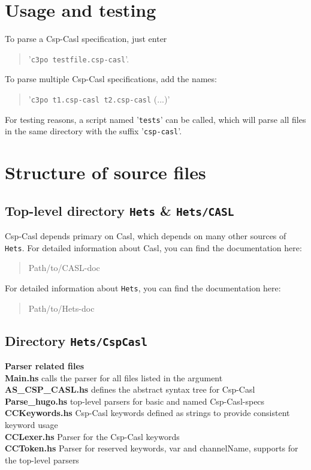 \documentclass[11pt, twoside]{article}
\begin{document}
\section{Usage and testing}

To parse a {\sc Csp-Casl} specification, just enter
\begin{quote}
'{\tt c3po testfile.csp-casl}'. 
\end{quote}
To parse multiple {\sc Csp-Casl} specifications, add the names: 
\begin{quote}
'{\tt c3po t1.csp-casl t2.csp-casl} (...)'
\end{quote}
For testing reasons, a script named '{\tt tests}' can be called, which will parse all files in the same directory with the suffix '{\tt csp-casl}'.   

\section{Structure of source files}

\subsection{Top-level directory {\tt Hets} \&  {\tt Hets/CASL}}

{\sc Csp-Casl} depends primary on {\sc Casl}, which depends on many other sources of {\tt Hets}. For detailed information about {\sc Casl}, you can find the documentation here:
\begin{quote}
Path/to/CASL-doc
\end{quote}
For detailed information about {\tt Hets}, you can find the documentation here:
\begin{quote}
Path/to/Hets-doc
\end{quote}

\subsection{Directory {\tt Hets/CspCasl}} 

{\bf Parser related files}\\
{\bf Main.hs} calls the parser for all files listed in the argument\\
{\bf AS\_CSP\_CASL.hs} defines the abstract syntax tree for {\sc Csp-Casl}\\
{\bf Parse\_hugo.hs} top-level parsers for basic and named {\sc Csp-Casl}-specs\\
{\bf CCKeywords.hs} {\sc Csp-Casl} keywords defined as strings to provide consistent keyword usage\\
{\bf CCLexer.hs} Parser for the {\sc Csp-Casl} keywords\\
{\bf CCToken.hs} Parser for reserved keywords, var and channelName, supports for the top-level parsers


\begin{appendix}


%
%

\end{appendix}
\end{document}
